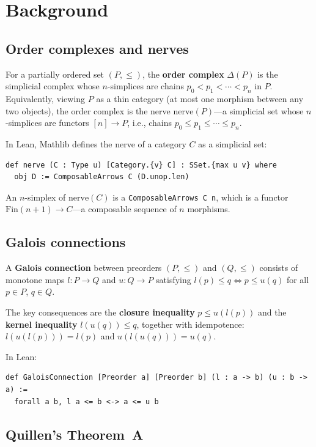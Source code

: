 \documentclass[11pt]{article}
\newcommand{\nerve}{\mathrm{nerve}}
\begin{document}
\section{Background}\label{sec:background}

\subsection{Order complexes and nerves}

For a partially ordered set $(P, \le)$, the \textbf{order complex} $\Delta(P)$
is the simplicial complex whose $n$-simplices are chains
$p_0 < p_1 < \cdots < p_n$ in $P$. Equivalently, viewing $P$ as a thin
category (at most one morphism between any two objects), the order complex is
the nerve $\nerve(P)$---a simplicial set whose $n$-simplices are functors
$[n] \to P$, i.e., chains $p_0 \le p_1 \le \cdots \le p_n$.

In Lean, Mathlib defines the nerve of a category $C$ as a simplicial set:
\begin{lstlisting}
def nerve (C : Type u) [Category.{v} C] : SSet.{max u v} where
  obj D := ComposableArrows C (D.unop.len)
\end{lstlisting}
An $n$-simplex of $\nerve(C)$ is a \texttt{ComposableArrows C n}, which is a
functor $\mathrm{Fin}(n+1) \to C$---a composable sequence of $n$ morphisms.

\subsection{Galois connections}

A \textbf{Galois connection} between preorders $(P, \le)$ and $(Q, \le)$
consists of monotone maps $l : P \to Q$ and $u : Q \to P$ satisfying
$l(p) \le q \iff p \le u(q)$ for all $p \in P$, $q \in Q$.

The key consequences are the \textbf{closure inequality} $p \le u(l(p))$ and
the \textbf{kernel inequality} $l(u(q)) \le q$, together with idempotence:
$l(u(l(p))) = l(p)$ and $u(l(u(q))) = u(q)$.

In Lean:
\begin{lstlisting}
def GaloisConnection [Preorder a] [Preorder b] (l : a -> b) (u : b -> a) :=
  forall a b, l a <= b <-> a <= u b
\end{lstlisting}

\subsection{Quillen's Theorem~A}
\end{document}
